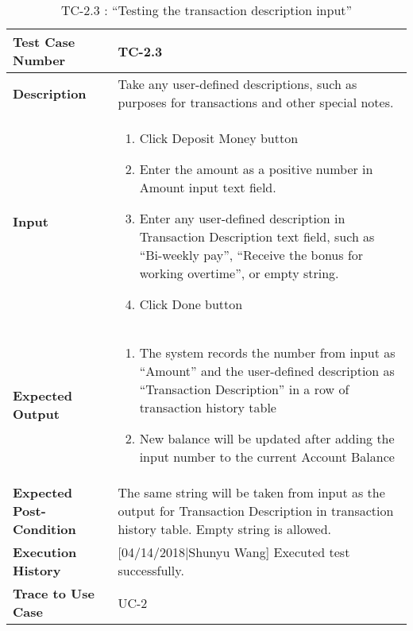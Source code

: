 \documentclass[12pt]{article}
\begin{document}
\begin{table}[H]
\caption{TC-2.3 : “Testing the transaction description input”}
\begin{center}
\begin{tabular}{|p{5	cm}|p{12cm}|}
\hline
\bf Test Case Number & 
TC-2.3 \\
\hline
\bf Description & 
Take any user-defined descriptions, such as purposes for transactions and other special notes.\\
\hline
\bf Input & 
\begin{enumerate}
  \item Click Deposit Money button
  \item Enter the amount as a positive number in Amount input text field.
  \item Enter any user-defined description in Transaction Description text field, such as “Bi-weekly pay”, “Receive the bonus for working overtime”, or empty string.
  \item Click Done button
\end{enumerate} \\
\hline
\bf Expected Output & 
\begin{enumerate}
  \item The system records the number from input as “Amount” and the user-defined description as “Transaction Description” in a row of transaction history table
  \item New balance will be updated after adding the input number to the current Account Balance
\end{enumerate} \\
\hline
\bf Expected Post-Condition & 
The same string will be taken from input as the output for Transaction Description in transaction history table. Empty string is allowed.\\
\hline
\bf Execution History & 
[04/14/2018|Shunyu Wang] Executed test successfully.\\
\hline
\bf Trace to Use Case & 
UC-2\\
\hline

\end{tabular}
\end{center}
\end{table}
\end{document}
